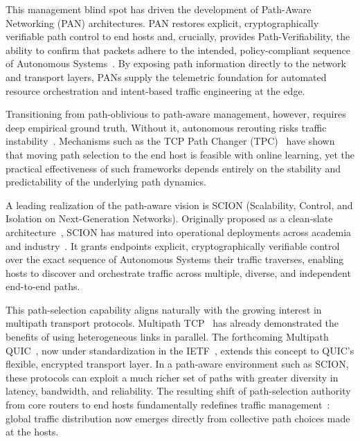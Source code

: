 \documentclass[pdflatex,sn-vancouver-num]{sn-jnl}%
\theoremstyle{thmstyleone}%
\theoremstyle{thmstyletwo}%
\theoremstyle{thmstylethree}%
\begin{document}
    This management blind spot has driven the development of Path-Aware Networking (PAN) architectures. 
    PAN restores explicit, cryptographically verifiable path control to end hosts and, crucially, provides Path-Verifiability, the ability to confirm that packets adhere to the intended, policy-compliant sequence of Autonomous Systems~\cite{borges2024pot}.
    By exposing path information directly to the network and transport layers, PANs supply the telemetric foundation for automated resource orchestration and intent-based traffic engineering at the edge. 
    
    Transitioning from path-oblivious to path-aware management, however, requires deep empirical ground truth. 
    Without it, autonomous rerouting risks traffic instability~\cite{jadin2022leveraging}. 
    Mechanisms such as the TCP Path Changer (TPC)~\cite{jadin2022leveraging} have shown that moving path selection to the end host is feasible with online learning, yet the practical effectiveness of such frameworks depends entirely on the stability and predictability of the underlying path dynamics.
    
    A leading realization of the path-aware vision is SCION (Scalability, Control, and Isolation on Next-Generation Networks). 
    Originally proposed as a clean-slate architecture~\cite{clark2018designing, zhang2011scion}, SCION has matured into operational deployments across academia and industry~\cite{anapaya2025}. 
    It grants endpoints explicit, cryptographically verifiable control over the exact sequence of Autonomous Systems their traffic traverses, enabling hosts to discover and orchestrate traffic across multiple, diverse, and independent end-to-end paths.
    
    This path-selection capability aligns naturally with the growing interest in multipath transport protocols. 
    Multipath TCP~\cite{rfc8684} has already demonstrated the benefits of using heterogeneous links in parallel. 
    The forthcoming Multipath QUIC~\cite{de2017multipath}, now under standardization in the IETF~\cite{ietf-quic-multipath-15}, extends this concept to QUIC's flexible, encrypted transport layer. 
    In a path-aware environment such as SCION, these protocols can exploit a much richer set of paths with greater diversity in latency, bandwidth, and reliability.
    The resulting shift of path-selection authority from core routers to end hosts fundamentally redefines traffic management~\cite{kruger2021early}: global traffic distribution now emerges directly from collective path choices made at the hosts.
    
\end{document}
